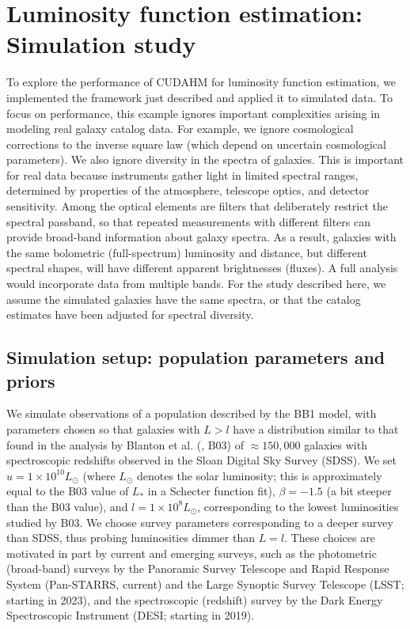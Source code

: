 \section{Luminosity function estimation: Simulation study}
\label{sec:lum_func_sim}

To explore the performance of CUDAHM for luminosity function estimation, we implemented the framework just described and applied it to simulated data.
To focus on performance, this example ignores important complexities arising in modeling real galaxy catalog data.
For example, we ignore cosmological corrections to the inverse square law (which depend on uncertain cosmological parameters).
We also ignore diversity in the spectra of galaxies.
This is important for real data because instruments gather light in limited spectral ranges, determined by properties of the atmosphere, telescope optics, and detector sensitivity.
Among the optical elements are filters that deliberately restrict the spectral passband, so that repeated measurements with different filters can provide broad-band information about galaxy spectra.
As a result, galaxies with the same bolometric (full-spectrum) luminosity and distance, but different spectral shapes, will have different apparent brightnesses (fluxes).
A full analysis would incorporate data from multiple bands.
For the study described here, we assume the simulated galaxies have the same spectra, or that the catalog estimates have been adjusted for spectral diversity.

\subsection{Simulation setup: population parameters and priors}
\label{sec:simsetup-popn}

We simulate observations of a population described by the BB1 model, with parameters chosen so that galaxies with $L>l$ have a distribution similar to that found in the analysis by Blanton et al. (\citealt{blanton2003galaxy}, B03) of $\approx 150,000$ galaxies with spectroscopic redshifts observed in the Sloan Digital Sky Survey (SDSS).
We set $u = 1\times 10^{10} L_\odot$ (where $L_\odot$ denotes the solar luminosity; this is approximately equal to the B03 value of $L_*$ in a Schecter function fit), $\beta = -1.5$ (a bit steeper than the B03 value), and $l= 1\times 10^{8} L_\odot$, corresponding to the lowest luminosities studied by B03.
We choose survey parameters corresponding to a deeper survey than SDSS, thus probing luminosities dimmer than $L=l$.
These choices are motivated in part by current and emerging surveys, such as the photometric (broad-band) surveys by the Panoramic Survey Telescope and Rapid Response System (Pan-STARRS, current) and the Large Synoptic Survey Telescope (LSST; starting in 2023),   and the spectroscopic (redshift) survey by the Dark Energy Spectroscopic Instrument (DESI; starting in 2019).


